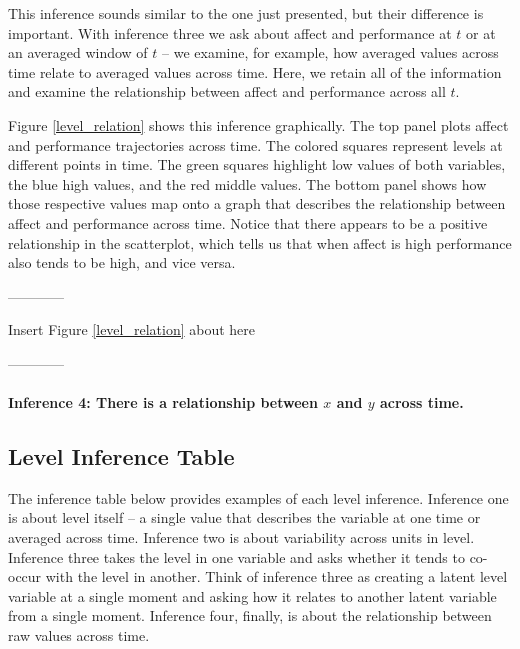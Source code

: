 \documentclass[english,,man]{apa6}
\let\oldparagraph\paragraph
\renewcommand{\paragraph}[1]{\oldparagraph{#1}\mbox{}}
\theoremstyle{definition}
\theoremstyle{definition}
\theoremstyle{definition}
\theoremstyle{remark}
\begin{document}
This inference sounds similar to the one just presented, but their
difference is important. With inference three we ask about affect and
performance at \(t\) or at an averaged window of \(t\) -- we examine,
for example, how averaged values across time relate to averaged values
across time. Here, we retain all of the information and examine the
relationship between affect and performance across all \(t\).

Figure \ref{level_relation} shows this inference graphically. The top
panel plots affect and performance trajectories across time. The colored
squares represent levels at different points in time. The green squares
highlight low values of both variables, the blue high values, and the
red middle values. The bottom panel shows how those respective values
map onto a graph that describes the relationship between affect and
performance across time. Notice that there appears to be a positive
relationship in the scatterplot, which tells us that when affect is high
performance also tends to be high, and vice versa.

\begin{center}

------------

Insert Figure \ref{level_relation} about here

------------

\end{center}

\hypertarget{inference-4-there-is-a-relationship-between-x-and-y-across-time.}{%
\paragraph{\texorpdfstring{Inference 4: There is a relationship between
\(x\) and \(y\) across
time.}{Inference 4: There is a relationship between x and y across time.}}\label{inference-4-there-is-a-relationship-between-x-and-y-across-time.}}

\hypertarget{level-inference-table}{%
\subsection{Level Inference Table}\label{level-inference-table}}

The inference table below provides examples of each level inference.
Inference one is about level itself -- a single value that describes the
variable at one time or averaged across time. Inference two is about
variability across units in level. Inference three takes the level in
one variable and asks whether it tends to co-occur with the level in
another. Think of inference three as creating a latent level variable at
a single moment and asking how it relates to another latent variable
from a single moment. Inference four, finally, is about the relationship
between raw values across time.
\end{document}
